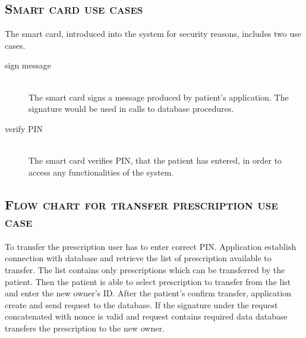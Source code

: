 \documentclass[12pt,titlepage]{article}
\begin{document}
\subsection{\textsc{Smart card use cases}}
The smart card, introduced into the system for security reasons, includes two use cases.
\begin{description}
\item[sign message] \hfill \\
The smart card signs a message produced by patient's application. 
The signature would be used in calls to database procedures.
\item[verify PIN] \hfill \\
The smart card verifies PIN, that the patient has entered, in order to access any functionalities of the system.
\end{description}
\subsection{\textsc{Flow chart for transfer prescription use case}}
To transfer the prescription user has to enter correct PIN. 
Application establish connection with database and retrieve the list of prescription available to transfer. 
The list contains only prescriptions which can be transferred by the patient. 
Then the patient is able to select prescription to transfer from the list and enter the new owner's ID. 
After the patient's confirm transfer, application create and send request to the database. 
If the signature under the request concatenated with nonce is valid and request contains required data database transfers the prescription to the new owner.
\end{document}
